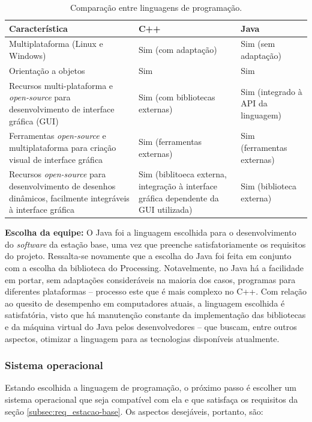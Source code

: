 \begin{table}[h]
  \caption{Comparação entre linguagens de programação.}
  \centering
  \begin{tabular}{p{6cm}|p{4cm}p{4cm}}
    \toprule
    \textbf{Característica} & \textbf{C++} & \textbf{Java} \\
    \hline
    Multiplataforma (Linux e Windows) & Sim (com adaptação) & Sim (sem adaptação) \\
    \hline
    Orientação a objetos & Sim & Sim \\
    \hline
    Recursos multi-plataforma e \textit{open-source} para desenvolvimento de interface gráfica (GUI) & Sim (com bibliotecas externas) & Sim (integrado à API da linguagem) \\
    \hline
    Ferramentas \textit{open-source} e multiplataforma para criação visual de interface gráfica & Sim (ferramentas externas) & Sim (ferramentas externas) \\
    \hline
    Recursos \textit{open-source} para desenvolvimento de desenhos dinâmicos, facilmente integráveis à interface gráfica & Sim (biblitoeca externa, integração à interface gráfica dependente da GUI utilizada) & Sim (biblioteca externa) \\
    \bottomrule
  \end{tabular}
  \label{tab:alternativas_linguagens}
\end{table}

\textbf{Escolha da equipe:} O Java foi a linguagem escolhida para o desenvolvimento do \textit{software} da estação base, uma vez que preenche satisfatoriamente os requisitos do projeto. Ressalta-se novamente que a escolha do Java foi feita em conjunto com a escolha da biblioteca do Processing. Notavelmente, no Java há a facilidade em portar, sem adaptações consideráveis na maioria dos casos, programas para diferentes plataformas -- processo este que é mais complexo no C++.  Com relação ao quesito de desempenho em computadores atuais, a linguagem escolhida é satisfatória, visto que há manutenção constante da implementação das bibliotecas e da máquina virtual do Java pelos desenvolvedores -- que buscam, entre outros aspectos, otimizar a linguagem para as tecnologias disponíveis atualmente.

\subsubsection{Sistema operacional}

Estando escolhida a linguagem de programação, o próximo passo é escolher um sistema operacional que seja compatível com ela e que satisfaça os requisitos da seção \ref{subsec:req_estacao-base}. Os aspectos desejáveis, portanto, são:

